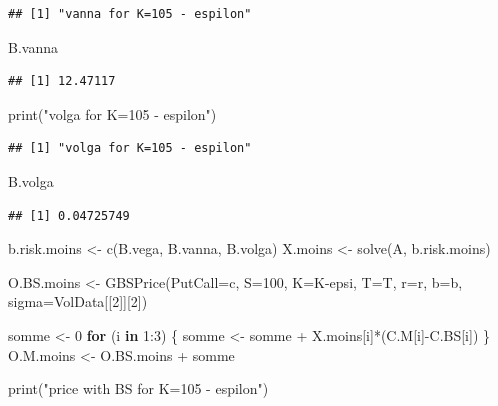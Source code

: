 \documentclass[
]{article}
\newenvironment{Shaded}{\begin{snugshade}}{\end{snugshade}}
\newcommand{\AttributeTok}[1]{\textcolor[rgb]{0.77,0.63,0.00}{#1}}
\newcommand{\ControlFlowTok}[1]{\textcolor[rgb]{0.13,0.29,0.53}{\textbf{#1}}}
\newcommand{\DecValTok}[1]{\textcolor[rgb]{0.00,0.00,0.81}{#1}}
\newcommand{\FunctionTok}[1]{\textcolor[rgb]{0.00,0.00,0.00}{#1}}
\newcommand{\NormalTok}[1]{#1}
\newcommand{\OtherTok}[1]{\textcolor[rgb]{0.56,0.35,0.01}{#1}}
\newcommand{\SpecialCharTok}[1]{\textcolor[rgb]{0.00,0.00,0.00}{#1}}
\newcommand{\StringTok}[1]{\textcolor[rgb]{0.31,0.60,0.02}{#1}}
\begin{document}
\begin{verbatim}
## [1] "vanna for K=105 - espilon"
\end{verbatim}

\begin{Shaded}
\begin{Highlighting}[]
\NormalTok{B.vanna}
\end{Highlighting}
\end{Shaded}

\begin{verbatim}
## [1] 12.47117
\end{verbatim}

\begin{Shaded}
\begin{Highlighting}[]
\FunctionTok{print}\NormalTok{(}\StringTok{"volga for K=105 {-} espilon"}\NormalTok{)}
\end{Highlighting}
\end{Shaded}

\begin{verbatim}
## [1] "volga for K=105 - espilon"
\end{verbatim}

\begin{Shaded}
\begin{Highlighting}[]
\NormalTok{B.volga}
\end{Highlighting}
\end{Shaded}

\begin{verbatim}
## [1] 0.04725749
\end{verbatim}

\begin{Shaded}
\begin{Highlighting}[]
\NormalTok{b.risk.moins }\OtherTok{\textless{}{-}} \FunctionTok{c}\NormalTok{(B.vega, B.vanna, B.volga)}
\NormalTok{X.moins }\OtherTok{\textless{}{-}} \FunctionTok{solve}\NormalTok{(A, b.risk.moins)}

\NormalTok{O.BS.moins }\OtherTok{\textless{}{-}} \FunctionTok{GBSPrice}\NormalTok{(}\AttributeTok{PutCall=}\StringTok{\textquotesingle{}c\textquotesingle{}}\NormalTok{, }\AttributeTok{S=}\DecValTok{100}\NormalTok{, }\AttributeTok{K=}\NormalTok{K}\SpecialCharTok{{-}}\NormalTok{epsi, }\AttributeTok{T=}\NormalTok{T, }\AttributeTok{r=}\NormalTok{r, }\AttributeTok{b=}\NormalTok{b, }\AttributeTok{sigma=}\NormalTok{VolData[[}\DecValTok{2}\NormalTok{]][}\DecValTok{2}\NormalTok{])}


\NormalTok{somme }\OtherTok{\textless{}{-}} \DecValTok{0}
\ControlFlowTok{for}\NormalTok{ (i }\ControlFlowTok{in} \DecValTok{1}\SpecialCharTok{:}\DecValTok{3}\NormalTok{) \{}
\NormalTok{  somme }\OtherTok{\textless{}{-}}\NormalTok{ somme }\SpecialCharTok{+}\NormalTok{ X.moins[i]}\SpecialCharTok{*}\NormalTok{(C.M[i]}\SpecialCharTok{{-}}\NormalTok{C.BS[i])}
\NormalTok{\}}
\NormalTok{O.M.moins }\OtherTok{\textless{}{-}}\NormalTok{ O.BS.moins }\SpecialCharTok{+}\NormalTok{ somme}

\FunctionTok{print}\NormalTok{(}\StringTok{"price with BS for K=105 {-} espilon"}\NormalTok{)}
\end{Highlighting}
\end{Shaded}
\end{document}
